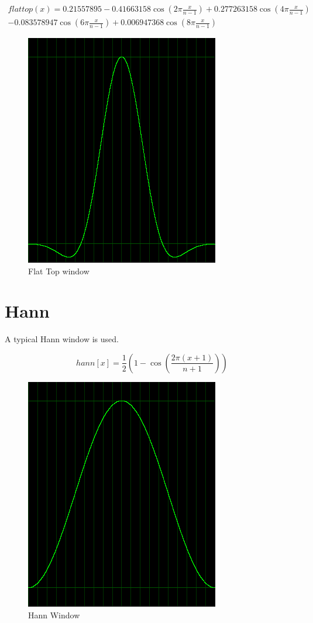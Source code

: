 \documentclass[10pt,a4paper]{report}
\begin{document}
\begin{appendices}
\begin{align*}
flattop(x)=0.21557895 - 0.41663158\cos(2\pi\frac{x}{n-1})+ 0.277263158\cos(4\pi\frac{x}{n-1})\\
- 0.083578947\cos(6\pi\frac{x}{n-1}) + 0.006947368\cos(8\pi\frac{x}{n-1})
\end{align*}

\begin{figure}[H]
	\centering
	\includegraphics[width=0.4\linewidth]{plots/window-flattop.png}
	\caption[Flat Top window]{Flat Top window}
	\label{fig:window-flattop}
\end{figure}

\newpage
\section{Hann}
A typical Hann window is used.

\begin{equation}
hann[x] = \frac{1}{2}(1 - \cos(\frac{2\pi(x+1)}{n+1}))
\end{equation}

\begin{figure}[H]
	\centering
	\includegraphics[width=0.4\linewidth]{plots/window-hann.png}
	\caption[Hann Window]{Hann Window}
	\label{fig:window-hann}
\end{figure}


\end{appendices}
\end{document}
